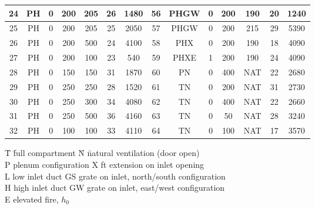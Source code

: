 \begin{table}[p]
\begin{center}
\begin{tabular}{|c|c|c|c|c|c|c||c|c|c|c|c|c|c|}
24   & PH      & 0     & 200        & 205       & 26         & 1480           &   56   & PHGW    & 0     & 200        & 190       & 20         & 1240        \\ \hline
25   & PH      & 0     & 200        & 205       & 25         & 2050           &   57   & PHGW    & 0     & 200        & 215       & 29         & 5390        \\ \hline
26   & PH      & 0     & 200        & 500       & 24         & 4100           &   58   & PHX     & 0     & 200        & 190       & 18         & 4090        \\ \hline
27   & PH      & 0     & 200        & 100       & 23         & 540            &   59   & PHXE    & 1     & 200        & 190       & 24         & 4090        \\ \hline
28   & PH      & 0     & 150        & 150       & 31         & 1870           &   60   & PN      & 0     & 400        & NAT       & 22         & 2680        \\ \hline
29   & PH      & 0     & 250        & 250       & 28         & 1520           &   61   & TN      & 0     & 200        & NAT       & 31         & 2730        \\ \hline
30   & PH      & 0     & 250        & 300       & 34         & 4080           &   62   & TN      & 0     & 400        & NAT       & 22         & 2660        \\ \hline
31   & PH      & 0     & 250        & 500       & 36         & 4160           &   63   & TN      & 0     & 50         & NAT       & 28         & 3240        \\ \hline
32   & PH      & 0     & 100        & 100       & 33         & 4110           &   64   & TN      & 0     & 100        & NAT       & 17         & 3570        \\ \hline
\end{tabular}
\end{center}
\begin{tabbing}
\hspace{0.7in} \= T \hspace{0.2in}  \= full compartment     \hspace{0.8in} \= N \hspace{0.2in} \= natural ventilation (door open) \\
               \> P                 \> plenum configuration                \> X                 ft extension on inlet opening \\
               \> L                 \> low inlet duct                      \> GS               \> grate on inlet, north/south configuration \\
               \> H                 \> high inlet duct                     \> GW               \> grate on inlet, east/west configuration \\
               \> E                 \> elevated fire, $h_0$
\end{tabbing}
\label{LLNL_Matrix}
\end{table}

